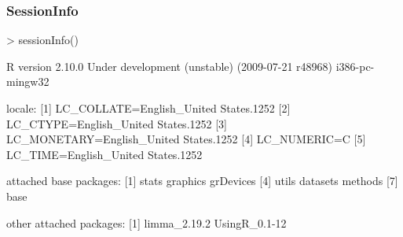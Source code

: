 \begin{frame}
  \frametitle{SessionInfo} \scriptsize
\begin{Schunk}
\begin{Sinput}
> sessionInfo()
\end{Sinput}
\begin{Soutput}
R version 2.10.0 Under development (unstable) (2009-07-21 r48968) 
i386-pc-mingw32 

locale:
[1] LC_COLLATE=English_United States.1252 
[2] LC_CTYPE=English_United States.1252   
[3] LC_MONETARY=English_United States.1252
[4] LC_NUMERIC=C                          
[5] LC_TIME=English_United States.1252    

attached base packages:
[1] stats     graphics  grDevices
[4] utils     datasets  methods  
[7] base     

other attached packages:
[1] limma_2.19.2  UsingR_0.1-12
\end{Soutput}
\end{Schunk}
\end{frame}



